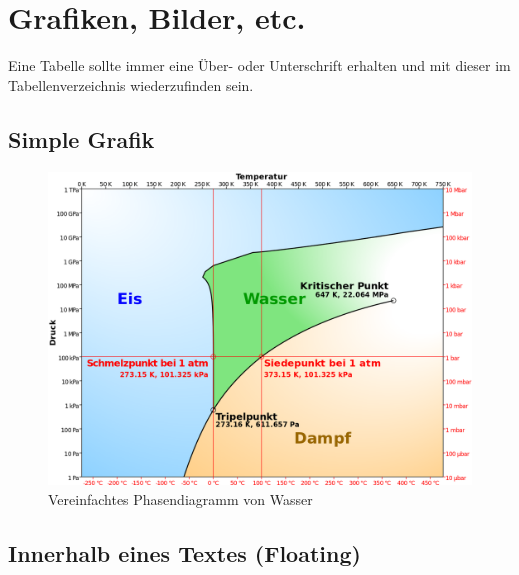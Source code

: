 \newpage

\section{Grafiken, Bilder, etc.}

Eine Tabelle sollte immer eine Über- oder Unterschrift erhalten und mit dieser im Tabellenverzeichnis wiederzufinden sein.

\subsection{Simple Grafik}

\begin{figure}[H]
	\centering
	\includegraphics[width=\linewidth]{content/xx_test/Phase_diagram_of_water_simplified.svg.png}
	\caption{Vereinfachtes Phasendiagramm von Wasser \cite{TestCitation020}}
\end{figure}

\newpage

\subsection{Innerhalb eines Textes (Floating)}

